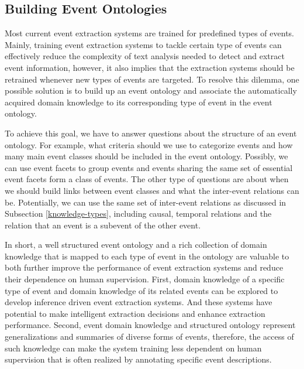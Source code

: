  
\subsection{Building Event Ontologies}

Most current event extraction systems 
are trained for predefined types of events. 
Mainly, training event extraction systems to tackle 
certain type of events can effectively reduce 
the complexity of text analysis needed to 
detect and extract event information, however, 
it also implies that the extraction systems 
should be retrained whenever new types of 
events are targeted. 
To resolve this dilemma, one possible solution is 
to build up an event ontology and associate 
the automatically acquired domain knowledge to 
its corresponding type of event in the event ontology. 

To achieve this goal, we have to answer questions about 
the structure of an event ontology. 
For example, what criteria should we use to categorize  
events and how many main event classes should be included 
in the event ontology. 
Possibly, we can use event facets to 
group events and events sharing the same set of 
essential event facets form a class of events. 
The other type of questions are about when we  
should build links between event classes and 
what the inter-event relations can be. 
Potentially, we can use the same set of 
inter-event relations as discussed in Subsection 
\ref{knowledge-types}, including 
causal, temporal relations and the relation that 
an event is a subevent of the other event. 

In short, a well structured event ontology and 
a rich collection of domain knowledge that 
is mapped to each type of event in the ontology 
are valuable to both further improve the performance 
of event extraction systems and reduce their dependence 
on human supervision. 
First, domain knowledge of a specific type of event and 
domain knowledge of its related events can be explored   
to develop inference driven event extraction systems.  
And these systems have potential to make intelligent extraction 
decisions and enhance extraction performance. 
Second, event domain knowledge and structured ontology 
represent generalizations and summaries of 
diverse forms of events, therefore, 
the access of such knowledge can 
make the system training less dependent on 
human supervision that is often realized by 
annotating specific event descriptions. 



